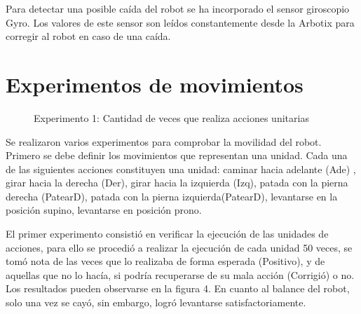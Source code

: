\documentclass[conference, letterpaper]{IEEEtranMC1}
\begin{document}
Para detectar una posible caída del robot se ha incorporado el sensor giroscopio Gyro. Los valores de este sensor son leídos constantemente desde la Arbotix para corregir al robot en caso de una caída.  

\section{Experimentos de movimientos }
\label{sec:experimento}

\begin{figure}
\label{fig:experimento1}

\caption{Experimento 1: Cantidad de veces que realiza acciones unitarias}
\end{figure}
Se realizaron varios experimentos para comprobar la movilidad del robot. Primero se debe definir los movimientos que representan una unidad. Cada una de las siguientes acciones constituyen una unidad: caminar hacia adelante (Ade) , girar hacia la derecha (Der), girar hacia la izquierda (Izq), patada con la pierna derecha (PatearD), patada con la pierna izquierda(PatearD), levantarse en la posición supino, levantarse en posición prono.

El primer experimento consistió en verificar la ejecución de las unidades de acciones, para ello se procedió a realizar la ejecución de cada unidad 50 veces, se tomó nota de las veces que lo realizaba de forma esperada (Positivo), y de aquellas que no lo hacía, si podría recuperarse de su mala acción (Corrigió) o no. Los resultados pueden observarse en la figura 4. En cuanto al balance del robot,  solo una vez se cayó, sin embargo, logró levantarse satisfactoriamente.
\end{document}
